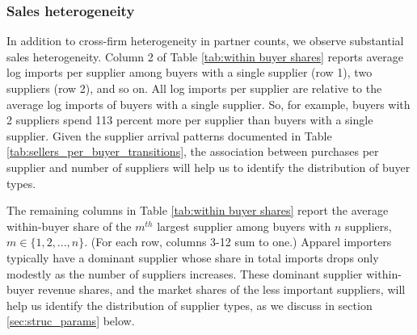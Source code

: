 \documentclass[12pt]{article} \usepackage{amsmath,amssymb,amsthm,geometry,graphicx,setspace,algorithm,algpseudocode,float}
\begin{document}
\subsubsection{Sales heterogeneity}

In addition to cross-firm heterogeneity in partner counts, we observe
substantial sales heterogeneity. Column 2 of
Table \ref{tab:within buyer shares} reports average log imports per supplier among buyers with a single supplier (row 1), two suppliers (row 2), and so on. All log imports per supplier are relative to the average log imports of buyers with a single supplier. So, for example, buyers with 2 suppliers spend 113 percent more per supplier than buyers with a single supplier. Given the supplier arrival patterns documented in Table \ref{tab:sellers_per_buyer_transitions}, the association between purchases per supplier and number of suppliers will help us to identify the distribution of buyer types.
\par
The remaining columns in Table \ref{tab:within buyer shares} report the average within-buyer share of the $m^{th}$ largest supplier among buyers with $n$ suppliers, $m \in \{1,2,...,n\}$. (For each row, columns 3-12 sum to one.) Apparel importers typically have a dominant supplier whose share in total imports drops only modestly as the number of suppliers increases. These dominant supplier within-buyer revenue shares, and the market shares of the less important suppliers, will help us identify the distribution of supplier types, as we discuss in section \ref{sec:struc_params} below.  
\end{document}
